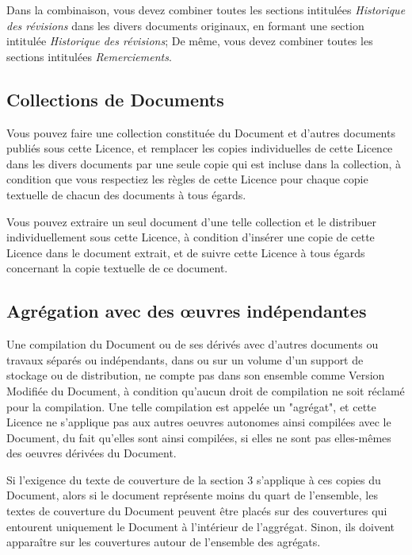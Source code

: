 	Dans la combinaison, vous devez combiner toutes les sections intitul\'ees \textit{Historique des révisions} dans les divers documents originaux, en formant une section intitul\'ee \textit{Historique des révisions}; De même, vous devez combiner toutes les sections intitul\'ees \textit{Remerciements}.

	\subsection{Collections de Documents}
	Vous pouvez faire une collection constitu\'ee du Document et d'autres documents publi\'es sous cette Licence, et remplacer les copies individuelles de cette Licence dans les divers documents par une seule copie qui est incluse dans la collection, à condition que vous respectiez les règles de cette Licence pour chaque copie textuelle de chacun des documents à tous \'egards.

	Vous pouvez extraire un seul document d'une telle collection et le distribuer individuellement sous cette Licence, à condition d'ins\'erer une copie de cette Licence dans le document extrait, et de suivre cette Licence à tous \'egards concernant la copie textuelle de ce document.

	\subsection{Agr\'egation avec des œuvres ind\'ependantes} 
	Une compilation du Document ou de ses d\'eriv\'es avec d'autres documents ou travaux s\'epar\'es ou ind\'ependants, dans ou sur un volume d'un support de stockage ou de distribution, ne compte pas dans son ensemble comme Version Modifi\'ee du Document, à condition qu'aucun droit de compilation ne soit r\'eclam\'e pour la compilation. Une telle compilation est appel\'ee un "agr\'egat", et cette Licence ne s'applique pas aux autres oeuvres autonomes ainsi compil\'ees avec le Document, du fait qu'elles sont ainsi compil\'ees, si elles ne sont pas elles-mêmes des oeuvres d\'eriv\'ees du Document.

	Si l'exigence du texte de couverture de la section 3 s'applique à ces copies du Document, alors si le document repr\'esente moins du quart de l'ensemble, les textes de couverture du Document peuvent être plac\'es sur des couvertures qui entourent uniquement le Document à l'int\'erieur de l'aggr\'egat. Sinon, ils doivent apparaître sur les couvertures autour de l'ensemble des agr\'egats.
	
